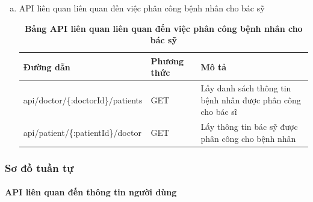 \begin{enumerate}[a)]
\begin{table}[H]
\begin{tabularx}{0.9\textwidth}{
  | >{\raggedright\arraybackslash}X
  | >{\raggedright\arraybackslash}m{2cm}
  | >{\raggedright\arraybackslash}X|
  }
  \end{tabularx}
  \label{table_api_ecg}
\end{table}


\item API liên quan liên quan đến việc phân công bệnh nhân cho bác sỹ



\begin{table}[H]
  \centering
  \caption{\bfseries \fontsize{12pt}{0pt}\selectfont Bảng API liên quan liên quan đến việc phân công bệnh nhân cho bác sỹ}
  \begin{tabularx}{0.9\textwidth}{
  | >{\raggedright\arraybackslash}X
  | >{\raggedright\arraybackslash}m{2cm}
  | >{\raggedright\arraybackslash}X|
  }
  \hline
  \bfseries Đường dẫn    &\bfseries Phương thức    &\bfseries Mô tả\\ \hline
   api/doctor/\{:doctorId\}/patients   &   GET  & Lấy danh sách thông tin bệnh nhân được phân công cho bác sĩ \\ \hline
  api/patient/\{:patientId\}/doctor  &    GET    & Lấy thông tin bác sỹ được phân công cho bệnh nhân \\ \hline

  \end{tabularx}
  \label{table_api_pat_doc}
\end{table}



\end{enumerate}




\subsubsection{Sơ đồ tuần tự}




\paragraph{API liên quan đến thông tin người dùng}
\mbox{}

